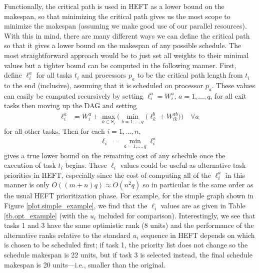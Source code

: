 \documentclass[12pt]{article}
\begin{document}
Functionally, the critical path is used in HEFT as a lower bound on the makespan, so that minimizing the critical path gives us the most scope to minimize the makespan (assuming we make good use of our parallel resources). With this in mind, there are many different ways we can define the critical path so that it gives a lower bound on the makespan of any possible schedule. The most straightforward approach would be to just set all weights to their minimal values but a tighter bound can be computed in the following manner. First, define $\ell_i^a$ for all tasks $t_i$ and processors $p_a$ to be the critical path length from $t_i$ to the end (inclusive), assuming that it is scheduled on processor $p_a$. These values can easily be computed recursively by setting $\ell_i^a = W_i^a$, $a = 1, \dots, q$, for all exit tasks then moving up the DAG and setting 
\begin{align}
\ell_i^a &= W_i^a + \max_{k \in S_i} \bigg( \min_{b = 1, \dots, q} \big( \ell_k^b + W_{ik}^{ab} \big)  \bigg) \quad \forall a \label{eq.opt_uia} 
\end{align}
for all other tasks. Then for each $i = 1, \dots, n$,
\begin{align}
\ell_i &= \min_{a = 1, \dots, q}\ell_i^a \label{eq.opt_ui} 
\end{align}
gives a true lower bound on the remaining cost of any schedule once the execution of task $t_i$ begins. These $\ell_i$ values could be useful as alternative task priorities in HEFT, especially since the cost of computing all of the $\ell_i^a$ in this manner is only $O((m + n)q) \approx O(n^2q)$ so in particular is the same order as the usual HEFT prioritization phase. For example, for the simple graph shown in Figure \ref{plot.simple_example}, we find that the $\ell_i$ values are as given in Table \ref{tb.opt_example} (with the $u_i$ included for comparison). Interestingly, we see that tasks 1 and 3 have the same optimistic rank (8 units) and the performance of the alternative ranks relative to the standard $u_i$ sequence in HEFT depends on which is chosen to be scheduled first; if task 1, the priority list does not change so the schedule makespan is 22 units, but if task 3 is selected instead, the final schedule makespan is 20 units---i.e., smaller than the original.
\end{document}
